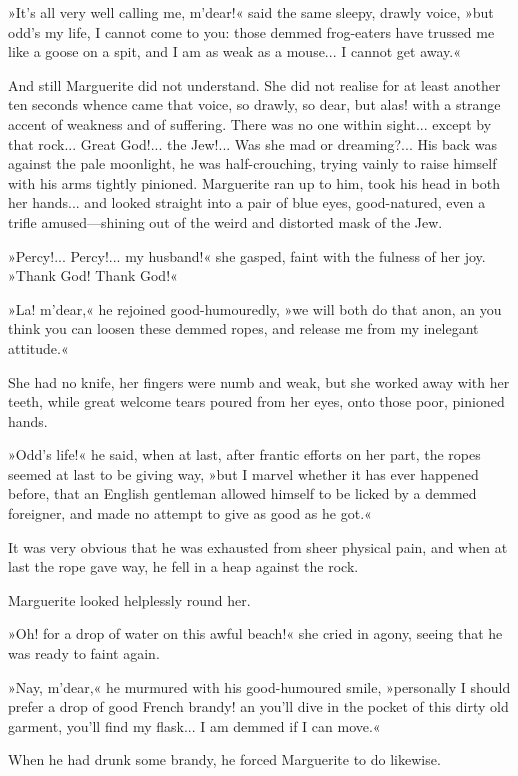 »It's all very well calling me, m'dear!« said the same sleepy, drawly voice, »but odd's my life, I cannot come to you: those demmed frog-eaters have trussed me like a goose on a spit, and I am as weak as a mouse... I cannot get away.«

And still Marguerite did not understand. She did not realise for at least another ten seconds whence came that voice, so drawly, so dear, but alas! with a strange accent of weakness and of suffering. There was no one within sight... except by that rock... Great God!... the Jew!... Was she mad or dreaming?... His back was against the pale moonlight, he was half-crouching, trying vainly to raise himself with his arms tightly pinioned. Marguerite ran up to him, took his head in both her hands... and looked straight into a pair of blue eyes, good-natured, even a trifle amused\allowbreak---\allowbreak shining out of the weird and distorted mask of the Jew.

»Percy!... Percy!... my husband!« she gasped, faint with the fulness of her joy. »Thank God! Thank God!«

»La! m'dear,« he rejoined good-humouredly, »we will both do that anon, an you think you can loosen these demmed ropes, and release me from my inelegant attitude.«

She had no knife, her fingers were numb and weak, but she worked away with her teeth, while great welcome tears poured from her eyes, onto those poor, pinioned hands.

»Odd's life!« he said, when at last, after frantic efforts on her part, the ropes seemed at last to be giving way, »but I marvel whether it has ever happened before, that an English gentleman allowed himself to be licked by a demmed foreigner, and made no attempt to give as good as he got.«

It was very obvious that he was exhausted from sheer physical pain, and when at last the rope gave way, he fell in a heap against the rock.

Marguerite looked helplessly round her.

»Oh! for a drop of water on this awful beach!« she cried in agony, seeing that he was ready to faint again.

»Nay, m'dear,« he murmured with his good-humoured smile, »personally I should prefer a drop of good French brandy! an you'll dive in the pocket of this dirty old garment, you'll find my flask... I am demmed if I can move.«

When he had drunk some brandy, he forced Marguerite to do likewise.

